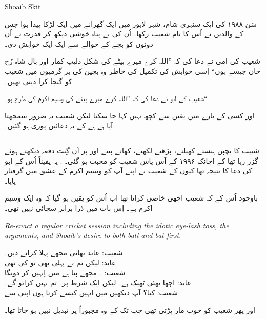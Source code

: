 \documentclass{article}
\begin{document}
\begin{center} \LARGE
	Shoaib Skit
\end{center}

\startUrdu

سَن ۱۹۸۸ کی ایک سنہری شام، شہر لاہور میں ایک گھرانے میں ایک لڑکا پیدا ہوا جس کے والدین نے اُس کا نام شعیب رکھا۔
اُن کی بے پناہ خوشی دیکھ کر قدرت نے اُن دونوں کو بچے کے حوالے سے ایک ایک خواہش دی۔ 

شعیب کی امی نے دعا کی کہ ''اللہ کرے میرے بیٹے کی شکل دلیپ کمار اور بال شاہ رُخ خان جیسے ہوں`` اِسی خواہش کی تکمیل کی خاطر وہ بچپن کی ہر گرمیوں میں شعیب کو گنجا کرا دیتی تھیں۔ \hfill {}

شعیب کے ابو نے دعا کی کہ ''اللہ کرے میرے بیٹے کی  وسیم اکرم کی طرح ہو۔``

اور کسی کے بارے میں یقین سے کچھ نہیں کہا جا سکتا لیکن شعیب یہ ضرور سمجھتا آیا ہے ہے کے یہ دعائیں پوری ہو گئیں۔

\rule{\textwidth}{1pt}

شییب کا بچپن ہنستے کھیلتے، پڑھتے لکھتے،  کھاتے پیتے اور  پر اَن گِنت دفعہ  دیکھتے ہوئے گزر رہا تھا کے اچانک ۱۹۹۶ کے آس پاس شعیب کو محبت ہو گئی۔
. 
یہ یقیناً اُس کے ابو کی دعا کا نتیجہ تھا کیوں کے شعیب نے اپنے آپ کو وسیم اکرم کے عشق میں گرفتار پایا۔

باوجود اُس کے کہ شعیب اچھی خاصی  کراتا تھا اب اُس کو یقین ہو گیا کہ وہ ایک  وسیم اکرم ہے۔
اِس بات میں ذرا برابر سچائی نہیں تھی۔

\begin{enpara}
	\itshape
	Re-enact a regular cricket session including the idotic eye-lash toss, the arguments, and Shoaib's desire to both ball and bat first.
\end{enpara}

\vspace{0.5\baselineskip}
شعیب:  عابد بھائی مجھے پہلا  کرانے دیں۔\\
عابد: لیکن تم نے پہلی  بھی تو کی تھی\\
شعیب: ۔ مجھے پتا ہے میں اِنہیں  کر دونگا\\
عابد: اچھا بھئی ٹھیک ہے۔
لیکن ایک شرط پر۔ 
تم  نہیں کرائو گے۔\\
شعیب: کیا؟ آپ دیکھیں میں انہیں کیسے  کرتا ہوں اپنی  سے

اور پھر شعیب کو خوب مار پڑتی تھی جب تک کے وہ مجبوراً  پر تبدیل نہیں ہو جاتا تھا۔
\end{document}
